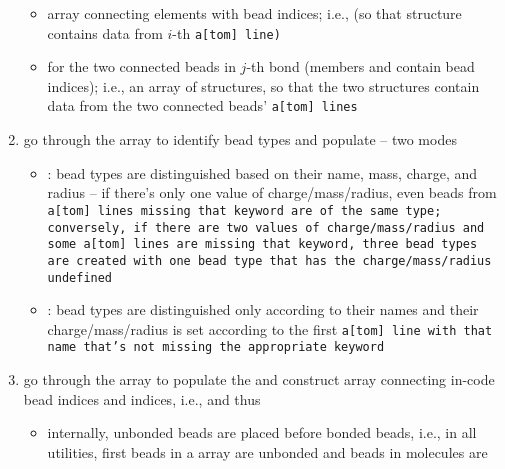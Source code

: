\begin{enumerate}
\begin{longtable}{lp{100mm}}
          \bottomrule
        \end{longtable}
    \begin{itemize}
      \item {} array connecting  elements with \vsf
        bead indices; i.e.,  (so that
         structure contains data from $i$-th
        \tt{a[tom]} line)
      \item {} for the two connected beads in $j$-th
        bond (members  and  contain \vsf
        bead indices); i.e., an array of structures, so that the two
         structures contain data from
        the two connected beads' \tt{a[tom]} lines
    \end{itemize}
  \item go through the  array to identify bead types and populate
     -- two modes
    \begin{itemize}
      \item {}: bead types are distinguished based on
        their name, mass, charge, and radius -- if there's only one value
        of charge/mass/radius, even beads from \tt{a[tom]} lines missing
        that keyword are of the same type; conversely, if there are two
        values of charge/mass/radius and some \tt{a[tom]} lines are missing
        that keyword, three bead types are created with one bead type that
        has the charge/mass/radius undefined
      \item {}: bead types are distinguished only
        according to their names and their charge/mass/radius is set
        according to the first \tt{a[tom]} line with that name that's not
        missing the appropriate keyword
    \end{itemize}
  \item go through the  array to populate the  and construct  array connecting
    in-code bead indices and \vsf indices, i.e.,  and thus 
    \begin{itemize}
      \item internally, unbonded beads are placed before bonded beads,
        i.e., in all utilities, first  beads in a
         array are unbonded and beads in molecules are

\end{itemize}
\end{enumerate}
